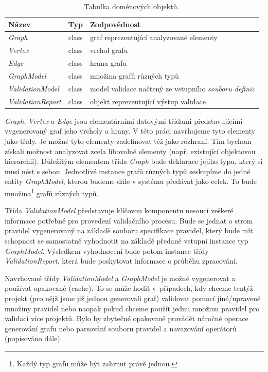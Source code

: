\begin{table}[h]
  \caption{Tabulka doménových objektů. \label{design-domain_object_table}}
  \begin{center}
    \begin{tabular}{| l | c | p{8cm} |}
      \hline
      \textbf{Název} & \textbf{Typ} & \textbf{Zodpovědnost} \\
      \hline
      \hline
      \emph{Graph} & class & graf reprezentující analyzované elementy \\ \hline
      \emph{Vertex} & class &  vrchol grafu \\ \hline
      \emph{Edge} & class & hrana grafu \\ \hline
      \emph{GraphModel} & class & množina grafů různých typů \\ \hline
      \hline
      \emph{ValidationModel} & class & model validace načtený ze vstupního \emph{souboru definic} \\ \hline
      \hline
      \emph{ValidationReport} & class &  objekt reprezentující výstup validace\\ \hline
    \end{tabular}
  \end{center}

\end{table}

\emph{Graph}, \emph{Vertex} a \emph{Edge} jsou elementárními datovými třídami představujícími vygenerovaný graf jeho vrcholy a hrany. V této práci navrhujeme tyto elementy jako třídy. Je možné tyto elementy zadefinovat též jako rozhraní. Tím  bychom získali možnost analyzovat zcela libovolné elementy (např. existující objektovou hierarchii). Důležitým elementem třída \emph{Graph} bude deklarace jejího typu, který si musí nést s sebou. Jednotlivé instance grafů různých typů seskupíme do jedné entity \emph{GraphModel}, kterou budeme dále v systému předávat jako celek. To bude množina\footnote{Každý typ grafu může být zahrnut právě jednou.} grafů různých typů.

Třída \emph{ValidationModel} představuje klíčovou komponentu nesoucí veškeré informace potřebné pro provedení validačního procesu. Bude se jednat o strom pravidel vygenerovaný na základě souboru specifikace pravidel, který bude mít schopnost se samostatně vyhodnotit na základě předané vstupní instance typ \emph{GraphModel}. Výsledkem vyhodnocení bude potom instance třídy \emph{ValidationReport}, která bude poskytovat informace o průběhu zpracování.

Navrhované třídy \emph{ValidationModel} a \emph{GraphModel} je možné vygenerovat a používat opakovaně (cache). To se může hodit v~případech, kdy chceme tentýž projekt (pro nějž jsme již jednou generovali graf) validovat pomocí jiné/upravené množiny pravidel nebo naopak pokud chceme použít jednu množinu pravidel pro validaci více projektů. Bylo by zbytečné opakovaně provádět náročné operace generování grafu nebo parsování souboru pravidel a navazování operátorů (popisováno dále).

